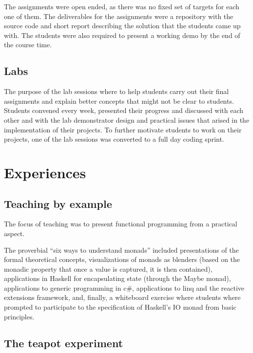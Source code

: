 \documentclass[conference]{IEEEtran}
\begin{document}
The assignments were open ended, as there was no fixed set of targets for
each one of them. The deliverables for the assignments were a repository
with the source code and short report describing the solution that the
students came up with. The students were also required to present a working
demo by the end of the course time.

\subsection{Labs}

The purpose of the lab sessions where to help students carry out their final
assignments and explain better concepts that might not be clear to students. 
Students convened every week, presented their progress and discussed with 
each other and with the lab demonstrator design and practical issues that
arised in the implementation of their projects. To further motivate students
to work on their projects, one of the lab sessions was converted to a full
day coding sprint.

\section{Experiences}

\subsection{Teaching by example}

The focus of teaching was to present functional programming from a 
practical aspect. 

The proverbial ``six ways to understand monads'' included presentations of the
formal theoretical concepts, visualizations of monads as blenders (based on the
monadic property that once a value is captured, it is then contained),
applications in Haskell for encapsulating state (through the \textsf{Maybe}
monad), applications to generic programming in {\sc c\#}, applications to {\sc
linq} and the reactive extensions framework, and, finally, a whiteboard exercise
where students where prompted to participate to the specification of Haskell's
\textsf{IO} monad from basic principles.



\subsection{The teapot experiment}
\end{document}
